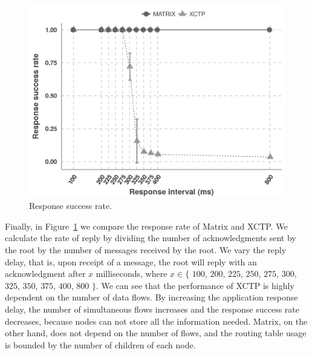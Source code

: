\begin{figure}[t]
    \centering
    \includegraphics[width=1\linewidth]{Images/new-response-success-per-response-time}
    \caption{Response success rate.}
    \label{fig:txrsp}
\end{figure}

Finally, in Figure~\ref{fig:txrsp} we compare the response rate of Matrix and XCTP. We calculate the rate of reply by dividing the number of acknowledgments sent by the root by the number of messages received by the root. We vary the reply delay, that is, upon receipt of a message, the root will reply with an acknowledgment after $x$ milliseconds, where $x \in  \{$ $100$, $200$, $225$, $250$, $275$, $300$, $325$, $350$, $375$, $400$, $800$ $\}$. We can see that the performance of XCTP is highly dependent on the number of data flows. By increasing the application response delay, the number of simultaneous flows increases and the response success rate decreases, because nodes can not store all the information needed. Matrix, on the other hand, does not depend on the number of flows, and the routing table usage is bounded by the number of children of each node.